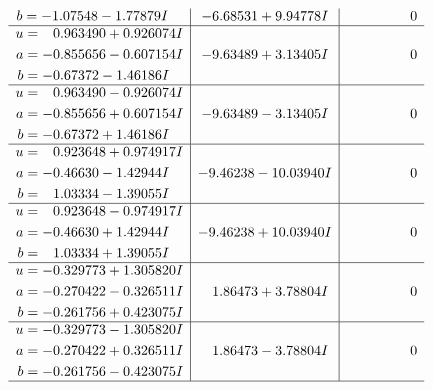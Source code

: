 \documentclass[1p]{elsarticle_modified}
\theoremstyle{definition}
\begin{document}
$$\begin{array}{c|c|c}
\begin{aligned}
b &= -1.07548 - 1.77879 I\end{aligned}
 & -6.68531 + 9.94778 I & \phantom{-0.000000 } 0 \\ \hline\begin{aligned}
u &= \phantom{-}0.963490 + 0.926074 I \\
a &= -0.855656 - 0.607154 I \\
b &= -0.67372 - 1.46186 I\end{aligned}
 & -9.63489 + 3.13405 I & \phantom{-0.000000 } 0 \\ \hline\begin{aligned}
u &= \phantom{-}0.963490 - 0.926074 I \\
a &= -0.855656 + 0.607154 I \\
b &= -0.67372 + 1.46186 I\end{aligned}
 & -9.63489 - 3.13405 I & \phantom{-0.000000 } 0 \\ \hline\begin{aligned}
u &= \phantom{-}0.923648 + 0.974917 I \\
a &= -0.46630 - 1.42944 I \\
b &= \phantom{-}1.03334 - 1.39055 I\end{aligned}
 & -9.46238 - 10.03940 I & \phantom{-0.000000 } 0 \\ \hline\begin{aligned}
u &= \phantom{-}0.923648 - 0.974917 I \\
a &= -0.46630 + 1.42944 I \\
b &= \phantom{-}1.03334 + 1.39055 I\end{aligned}
 & -9.46238 + 10.03940 I & \phantom{-0.000000 } 0 \\ \hline\begin{aligned}
u &= -0.329773 + 1.305820 I \\
a &= -0.270422 - 0.326511 I \\
b &= -0.261756 + 0.423075 I\end{aligned}
 & \phantom{-}1.86473 + 3.78804 I & \phantom{-0.000000 } 0 \\ \hline\begin{aligned}
u &= -0.329773 - 1.305820 I \\
a &= -0.270422 + 0.326511 I \\
b &= -0.261756 - 0.423075 I\end{aligned}
 & \phantom{-}1.86473 - 3.78804 I & \phantom{-0.000000 } 0\\
 \hline 
 \end{array}$$\newpage$$\begin{array}{c|c|c}  

\end{array}$$
\end{document}
